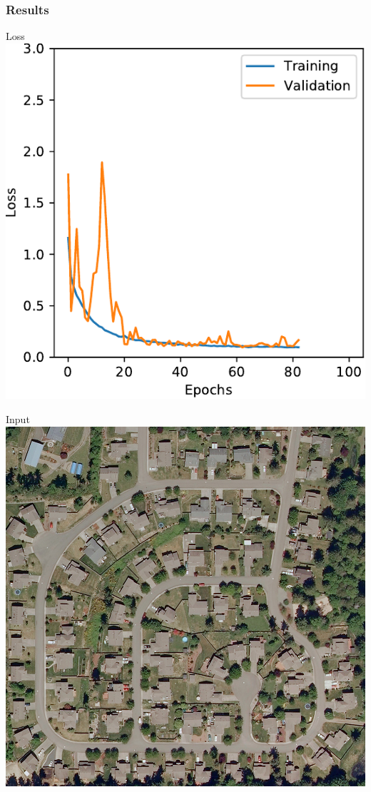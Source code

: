 \documentclass[usenames,dvipsnames,10pt]{beamer}
\begin{document}
\begin{frame}
\frametitle{Results}
\begin{minipage}[]{0.3\textwidth}
\centering
Loss
\includegraphics[width=\textwidth]{graphics/loss02.pdf}
\end{minipage}
\hspace{0.25cm}
\begin{minipage}[]{0.3\textwidth}
\centering
Input
\includegraphics[width=\textwidth]{graphics/aerial02.jpg}

\end{minipage}
\end{frame}
\end{document}
